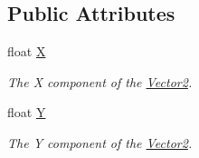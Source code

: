 \subsection*{Public Attributes}
\begin{DoxyCompactItemize}
\item 
float \hyperlink{struct_open_t_k_1_1_vector2_a26626fe0414169641852bfaf089c05f0}{X}
\begin{DoxyCompactList}\small\item\em The X component of the \hyperlink{struct_open_t_k_1_1_vector2}{Vector2}. \end{DoxyCompactList}\item 
float \hyperlink{struct_open_t_k_1_1_vector2_af6afa39de08795147e25a695472fa3a8}{Y}
\begin{DoxyCompactList}\small\item\em The Y component of the \hyperlink{struct_open_t_k_1_1_vector2}{Vector2}. \end{DoxyCompactList}\end{DoxyCompactItemize}
